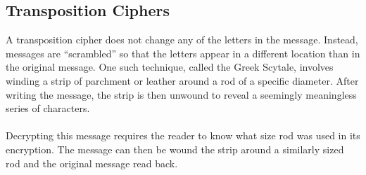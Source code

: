 			\subsection*{Transposition Ciphers}
				A transposition cipher does not change any of the letters in the message. Instead, messages are ``scrambled'' so that the letters appear in a different location than in the original message. One such technique, called the Greek Scytale, involves winding a strip of parchment or leather around a rod of a specific diameter. After writing the message, the strip is then unwound to reveal a seemingly meaningless series of characters.\\[\baselineskip]
				\ \\[9pt]
				Decrypting this message requires the reader to know what size rod was used in its encryption. The message can then be wound the strip around a similarly sized rod and the original message read back.

